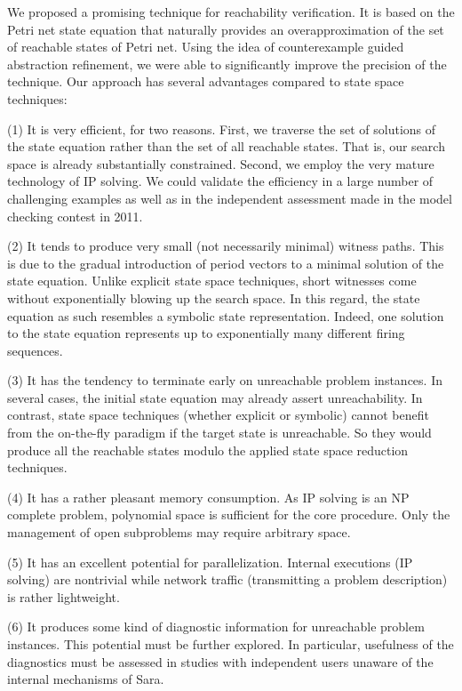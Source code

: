 \documentclass{LMCS}
\begin{document}
We proposed a promising technique for reachability verification. It is based on the Petri net state equation that naturally
provides an overapproximation of the set of reachable states of  Petri net. Using the idea of counterexample
guided abstraction refinement, we were able to significantly improve the precision of the technique. Our approach has
several advantages compared to state space techniques:

(1) It is very efficient, for two reasons. First, we traverse the set of solutions of the state equation rather than the set of all
reachable states. That is, our search space is already substantially constrained. Second, we employ the very mature
technology of IP solving. We could validate the efficiency in a large number of challenging examples as well as in the
independent assessment made in the model checking contest in 2011.

(2) It tends to produce very small (not necessarily minimal) witness paths. This is due to the gradual introduction of
period vectors to a minimal solution of the state equation. Unlike explicit state space techniques, short witnesses come
without exponentially blowing up the search space. In this regard, the state equation as such resembles a symbolic
state representation. Indeed, one solution to the state equation represents up to exponentially many different firing
sequences.

(3) It has the tendency to terminate early on unreachable problem instances. In several cases, the initial state equation
may already assert unreachability. In contrast, state space techniques (whether explicit or symbolic)
cannot benefit from the on-the-fly paradigm if
the target state is unreachable. So they would produce all the reachable states modulo the applied state space reduction
techniques.

(4) It has a rather pleasant memory consumption. As IP solving is an NP complete problem, polynomial space is sufficient for
the core procedure. Only the management of open subproblems may require arbitrary space.

(5) It has an excellent potential for parallelization. Internal executions (IP solving) are nontrivial while network traffic (transmitting
a problem description) is rather lightweight.

(6) It produces some kind of diagnostic information for unreachable problem instances. This potential must be further explored.
In particular, usefulness of the diagnostics must be assessed in studies with independent users unaware of the
internal mechanisms of Sara.
\end{document}
